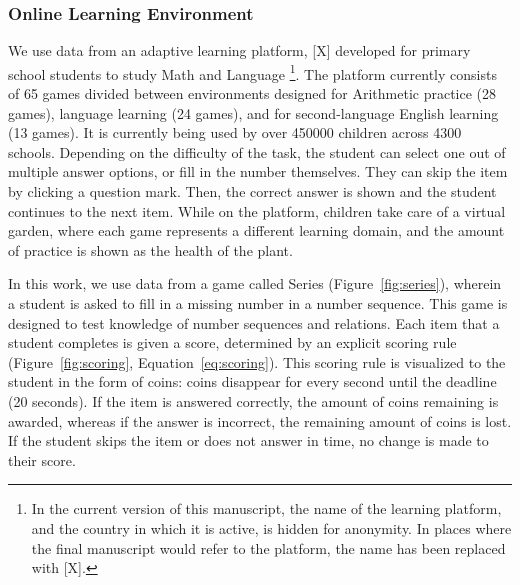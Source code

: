 \documentclass[12pt]{article}
\begin{document}
\subsubsection{Online Learning Environment}
We use data from an adaptive learning platform, [X] developed for primary school students to study Math and Language \footnote{In the current version of this manuscript, the name of the learning platform, and the country in which it is active, is hidden for anonymity. In places where the final manuscript would refer to the platform, the name has been replaced with [X].}. The platform currently consists of 65 games divided between environments designed for Arithmetic practice (28 games), language learning (24 games), and for second-language English learning (13 games). It is currently being used by over \num{450000} children across \num{4300} schools. Depending on the difficulty of the task, the student can select one out of multiple answer options, or fill in the number themselves. They can skip the item by clicking a question mark. Then, the correct answer is shown and the student continues to the next item. While on the platform, children take care of a virtual garden, where each game represents a different learning domain, and the amount of practice is shown as the health of the plant. 

In this work, we use data from a game called Series (Figure~\ref{fig:series}), wherein a student is asked to fill in a missing number in a number sequence. This game is designed to test knowledge of number sequences and relations. Each item that a student completes is given a score, determined by an explicit scoring rule (Figure~\ref{fig:scoring}, Equation~\ref{eq:scoring}). This scoring rule is visualized to the student in the form of coins: coins disappear for every second until the deadline (20 seconds). If the item is answered correctly, the amount of coins remaining is awarded, whereas if the answer is incorrect, the remaining amount of coins is lost. If the student skips the item or does not answer in time, no change is made to their score. 
\end{document}
